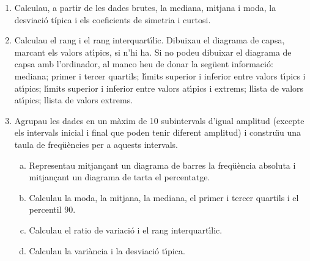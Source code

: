 \documentclass[11pt]{article}
\begin{document}
\begin{enumerate}[1-]
\item  Calculau, a partir de les dades brutes, la mediana, mitjana i moda, la desviaci\'o t\'ipica i els coeficients de simetria i curtosi.

\item Calculau el rang i el rang interquart\'{\i}lic. Dibuixau el diagrama de capsa, marcant els valors at\'{\i}pics, si n'hi ha. 
Si no podeu dibuixar el diagrama de capsa amb l'ordinador, al manco heu de donar la seg\"uent informaci\'o: mediana; primer i tercer quartils; l\'\i mits
superior i inferior entre valors t\'\i pics i at\'\i pics; l\'\i mits superior i inferior entre valors at\'\i pics i extrems; llista de valors
at\'\i pics; llista de valors extrems.


\item  Agrupau les dades en un m\`axim de 10 subintervals d'igual amplitud (excepte els intervals inicial i final que poden tenir diferent amplitud)
i constru\"{\i}u una taula de freq\"u\`encies per a aquests intervals.
\begin{enumerate}[a)]
\item Representau mitjan\c{c}ant un diagrama de barres la freq\"u\`encia absoluta i mitjan\c{c}ant un diagrama de 
tarta el percentatge.
\item  Calculau la moda, la mitjana, la mediana, el primer i tercer quartils i el percentil
90.
\item  Calculau el ratio de variaci\'o i el rang interquart\'{\i}lic. 
\item  Calculau la vari\`ancia i la desviaci\'o t\'{\i}pica.
\end{enumerate}
\end{enumerate}
\end{document}
